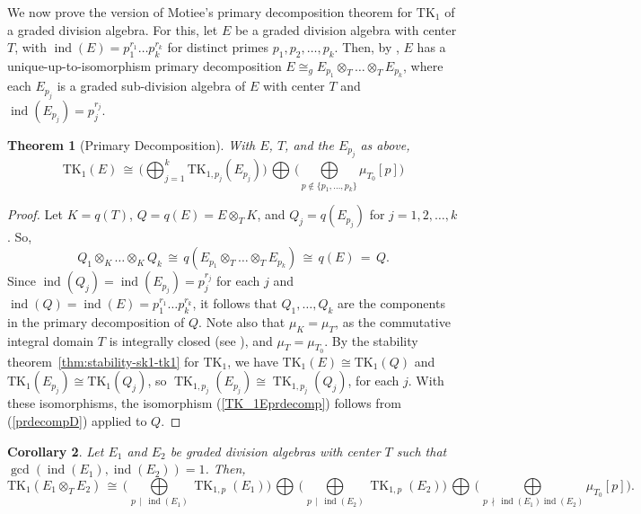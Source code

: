\documentclass[11pt]{article}
\numberwithin{equation}{section}
\theoremstyle{plain}
\newtheorem{theorem}{Theorem}[section]
\newtheorem{corollary}[theorem]{Corollary}
\theoremstyle{remark}
\newcommand{\opn}{\operatorname}
\newcommand{\TK}{\opn{TK_1}}
\begin{document}
We now prove the version of Motiee's primary decomposition theorem for $\TK$ of a graded division algebra.
For this, let $E$ be a graded division algebra with center $T$, with $\opn{ind}(E) = p_1^{r_1}\ldots p_k^{r_k}$  
for distinct primes $p_1, p_2, \ldots, p_k$.  Then, by \cite[Remark~6.7]{tignol-wadsworth-2015}, $E$ has a 
 unique-up-to-isomorphism primary decomposition
 ${E \cong_g E_{p_1}\otimes _T \ldots \otimes_T E_{p_k}}$, where each $E_{p_j}$ is a graded sub-division 
 algebra of $E$ with 
 center $T$ and $\opn{ind}(E_{p_j}) = p_j^{r_j}$. 
 
 \begin{theorem} [Primary Decomposition] With $E$, $T$, and the $E_{p_j}$ as above, 
 \label{prdecompTK_1E}
 \begin{equation}
 \label{TK_1Eprdecomp}
        \mathrm{TK}_1(E)\,
        \cong\,
        \big(
        {\textstyle\bigoplus}_{j=1}^k \mathrm{TK}_{1,p_j}(E_{p_j})
        \big)
        \,{\textstyle\bigoplus}\,
        \big(
        \underset{p\notin\{p_1,\ldots,p_k\}}{\textstyle\bigoplus}
        \mu_{T_0}[p]
        \big)
 \end{equation}
 \end{theorem} 
 
\begin{proof}
 Let $K = q(T)$, $Q = q(E) = E \otimes_T K$, and $Q_j = q(E_{p_j})$ for $j = 1,2, \ldots, k$.  
 So, 
 $$
 Q_1 \otimes_K \ldots \otimes_K Q_k \,\cong\,  q(E_{p_1} \otimes_T \ldots \otimes_T E_{p_k})\, \cong \,q(E) \,=\,Q.
 $$
 Since $\opn{ind}(Q_j) = \opn{ind}(E_{p_j}) = p_j^{r_j}$ for each $j$ and 
 $\opn{ind}(Q) = \opn{ind} (E) = p_1^{r_1} \ldots p_k^{r_k}$,
 it follows that $Q_1, \ldots ,Q_k$ are the components in the primary decomposition of $Q$.  
  Note also that $\mu_ K = \mu_T$, as the commutative integral domain $T$  is integrally closed 
 (see \cite[Prop.~5.2]{tignol-wadsworth-2015}), and $\mu_T = \mu_{T_0}$.  
  By the stability theorem~\ref{thm:stability-sk1-tk1} for $\TK$, we have $\TK(E) \cong \TK(Q)$ and 
  $\TK(E_{p_j}) \cong \TK(Q_j)$, 
  so  $\opn{TK}_{1, p_j}(E_{p_j}) \cong \opn{TK}_{1, p_j}(Q_j)$, for each $j$.  With these isomorphisms,
  the isomorphism (\ref{TK_1Eprdecomp}) follows from (\ref{prdecompD}) applied to $Q$.
 \end{proof}

 
 
 \begin{corollary} Let $E_1$ and $E_2$ be graded division algebras with center  $T$ such that 
 ${\opn{gcd}(\opn{ind}(E_1), \opn{ind}(E_2)) = 1}$.  Then, 
 \begin{equation}
\label{TKEtensorprod}
       \TK(E_1\otimes_T E_2)\, \cong\,
        \Big(\underset{\,p\,\mid\,\opn{ind}(E_1)}{\textstyle\bigoplus}\opn{TK}_{1,p}(E_1)\Big)
        \,{\textstyle{\bigoplus}}\,
        \Big(\underset{\,p\,\mid\,\operatorname{ind}(E_2)}{\textstyle{\bigoplus}}\opn{TK}_{1,p}(E_2)\Big)
         \,{\textstyle{\bigoplus}}\,
        \Big(\underset{\,p\,\nmid\,\opn{ind}(E_1)\opn{ind}(E_2)}{\textstyle{\bigoplus}}       \mu_{T_0}[p]\Big).
\end{equation} 
 \end{corollary}
 
\end{document}
